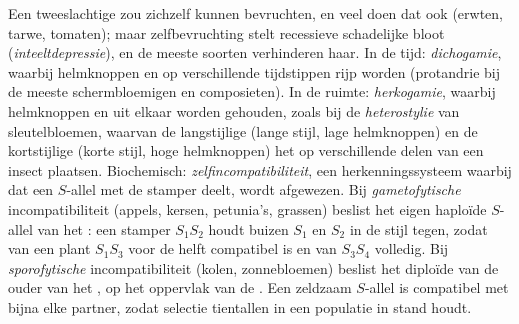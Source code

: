 \begin{proposition}\label{prop:b2:angiosperm-reproduction:selfing}
Een tweeslachtige  zou zichzelf kunnen bevruchten, en veel 
doen dat ook (erwten, tarwe, tomaten); maar zelfbevruchting stelt
recessieve schadelijke  bloot (\emph{inteeltdepressie}), en de
meeste soorten verhinderen haar. In de tijd: \emph{dichogamie}, waarbij
helmknoppen en  op verschillende tijdstippen rijp worden
(protandrie bij de meeste schermbloemigen en composieten). In de ruimte:
\emph{herkogamie}, waarbij helmknoppen en  uit elkaar worden
gehouden, zoals bij de \emph{heterostylie} van sleutelbloemen, waarvan de
langstijlige  (lange stijl, lage helmknoppen) en de kortstijlige
 (korte stijl, hoge helmknoppen) het  op verschillende
delen van een insect plaatsen. Biochemisch:
\emph{zelfincompatibiliteit}, een herkenningssysteem waarbij  dat
een $S$-allel met de stamper deelt, wordt afgewezen. Bij
\emph{gametofytische} incompatibiliteit (appels, kersen, petunia's,
grassen) beslist het eigen haploïde $S$-allel van het : een
stamper
$S_1S_2$ houdt buizen $S_1$ en $S_2$ in de stijl tegen, zodat  van
een plant $S_1S_3$ voor de helft compatibel is en van $S_3S_4$ volledig. Bij
\emph{sporofytische} incompatibiliteit (kolen, zonnebloemen) beslist het
diploïde  van de ouder van het , op het oppervlak van de
. Een zeldzaam $S$-allel is compatibel met bijna elke partner,
zodat selectie tientallen  in een populatie in stand houdt.
\end{proposition}
